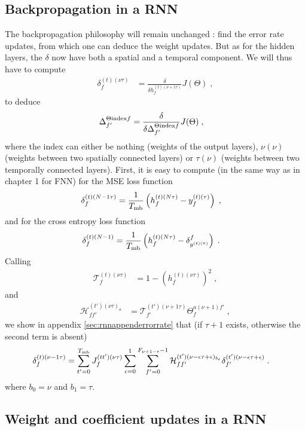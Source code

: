 \subsection{Backpropagation in a RNN}

The backpropagation philosophy will remain unchanged : find the error rate updates, from which one can deduce the weight updates. But as for the hidden layers, the $\delta$ now have both a spatial and a temporal component. We will thus have to compute 
\begin{align}
\delta^{(t)( \nu\tau)}_f&=\frac{\delta}{\delta h^{(t)( \nu+1\tau)}_f }J(\Theta)\;,
\end{align}
to deduce
\begin{align}
\Delta^{\Theta{\rm index}f}_{f'}&=\frac{\delta}{\delta \Delta^{\Theta{\rm index}f}_{f'} }J(\Theta)\;,
\end{align}
where the index can either be nothing (weights of the output layers), $\nu(\nu)$ (weights between two spatially connected layers) or  $\tau(\nu)$ (weights between two temporally connected layers). First, it is easy to compute (in the same way as in chapter 1 for FNN) for the MSE loss function
\begin{align}
\delta^{(t)(N-1\tau)}_f&= \frac{1}{T_{{\rm mb}}}\left(h_{f}^{(t)(N\tau)}-y_f^{(t)(\tau)}\right)\;,
\end{align}
and for the cross entropy loss function
\begin{align}
\delta^{(t)(N-1)}_{f}&= \frac{1}{T_{{\rm mb}}}\left(h_{f}^{(t)(N\tau)}-\delta^f_{y^{(t)(\tau)}}\right)\;.
\end{align}
Calling 
\begin{align}
\mathcal{T}_{f}^{(t)(\nu\tau)}&=1-\left(h_{f}^{(t)(\nu\tau)}\right)^2\;,
\end{align}
and
\begin{align}
\mathcal{H}^{(t')(\nu\tau)_a}_{ff'}&=\mathcal{T}^{(t')(\nu+1\tau)}_{f'}\Theta^{a(\nu+1)f'}_{f}\;,
\end{align}
we show in appendix \ref{sec:rnnappenderrorrate} that (if $\tau+1$ exists, otherwise the second term is absent)
\begin{align}
\delta^{(t)(\nu-1\tau)}_f&= 
%
\sum_{t'=0}^{T_{{\rm mb}}}J^{(tt')(\nu\tau)}_f\sum_{\epsilon=0}^{1}\sum_{f'=0}^{F_{\nu+1-\epsilon}-1}
%
\mathcal{H}^{(t')(\nu-\epsilon\tau+\epsilon)_{b_\epsilon}}_{ff'}\delta^{(t')(\nu-\epsilon\tau+\epsilon)}_{f'}\;.
\end{align}
where $b_0=\nu$ and $b_1=\tau$.

\subsection{Weight and coefficient updates in a RNN}


